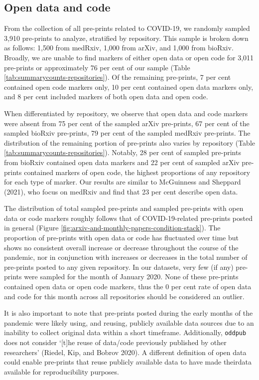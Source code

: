 \documentclass[
]{article}
\begin{document}
\hypertarget{open-data-and-code}{%
\subsection{Open data and code}\label{open-data-and-code}}

From the collection of all pre-prints related to COVID-19, we randomly sampled 3,910 pre-prints to analyze, stratified by repository. This sample is broken down as follows: 1,500 from medRxiv, 1,000 from arXiv, and 1,000 from bioRxiv. Broadly, we are unable to find markers of either open data or open code for 3,011 pre-prints or approximately 76 per cent of our sample (Table \ref{tab:summarycounts-repositories}). Of the remaining pre-prints, 7 per cent contained open code markers only, 10 per cent contained open data markers only, and 8 per cent included markers of both open data and open code.

When differentiated by repository, we observe that open data and code markers were absent from 75 per cent of the sampled arXiv pre-prints, 67 per cent of the sampled bioRxiv pre-prints, 79 per cent of the sampled medRxiv pre-prints. The distribution of the remaining portion of pre-prints also varies by repository (Table \ref{tab:summarycounts-repositories}). Notably, 28 per cent of sampled pre-prints from bioRxiv contained open data markers and 22 per cent of sampled arXiv pre-prints contained markers of open code, the highest proportions of any repository for each type of marker. Our results are similar to McGuinness and Sheppard (2021), who focus on medRxiv and find that 23 per cent describe open data.

The distribution of total sampled pre-prints and sampled pre-prints with open data or code markers roughly follows that of COVID-19-related pre-prints posted in general (Figure \ref{fig:arxiv-and-monthly-papers-condition-stack}). The proportion of pre-prints with open data or code has fluctuated over time but shows no consistent overall increase or decrease throughout the course of the pandemic, nor in conjunction with increases or decreases in the total number of pre-prints posted to any given repository. In our datasets, very few (if any) pre-prints were sampled for the month of January 2020. None of these pre-prints contained open data or open code markers, thus the 0 per cent rate of open data and code for this month across all repositories should be considered an outlier.

It is also important to note that pre-prints posted during the early months of the pandemic were likely using, and reusing, publicly available data sources due to an inability to collect original data within a short timeframe. Additionally, \texttt{oddpub} does not consider `{[}t{]}he reuse of data/code previously published by other researchers' (Riedel, Kip, and Bobrov 2020). A different definition of open data could enable pre-prints that reuse publicly available data to have made theirdata available for reproducibility purposes.
\end{document}
